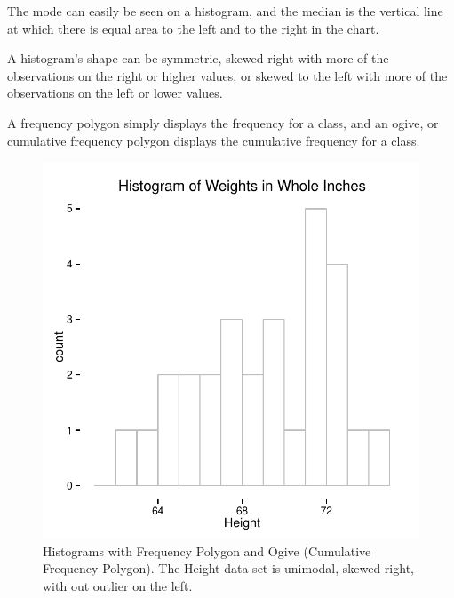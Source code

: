 \documentclass[nohyper,justified]{tufte-handout}\usepackage[]{graphicx}\usepackage[]{color}
\makeatletter
\def\maxwidth{ %
  \ifdim\Gin@nat@width>\linewidth
    \linewidth
  \else
    \Gin@nat@width
  \fi
}
\newenvironment{knitrout}{}{} %
\makeatother
\begin{document}
The mode can easily be seen on a histogram, and the median is the vertical line at which there is equal area to the left and to the right in the chart. 

A histogram's shape can be symmetric, skewed right with more of the observations on the right or higher values, or skewed to the left with more of the observations on the left or lower values.

A frequency polygon simply displays the frequency for a class, and an ogive, or cumulative frequency polygon displays the cumulative frequency for a class. 

\begin{knitrout}
\color{fgcolor}\begin{figure}

{\centering \includegraphics[width=\maxwidth]{figure/graphics-histogram-1} 

}

\caption[Histograms with Frequency Polygon and Ogive (Cumulative Frequency Polygon)]{Histograms with Frequency Polygon and Ogive (Cumulative Frequency Polygon). The Height data set is unimodal, skewed right, with out outlier on the left. }\label{fig:histogram1}
\end{figure}

\begin{figure}


\end{figure}
\end{knitrout}
\end{document}
